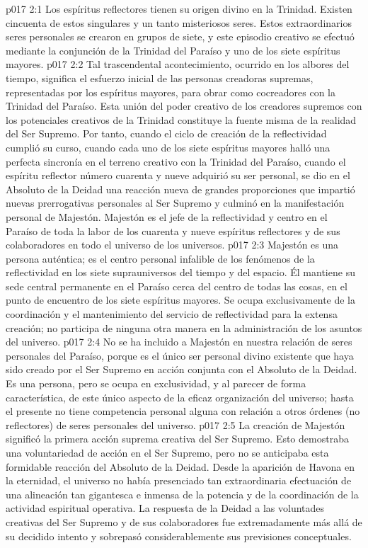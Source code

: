 \vs p017 2:1 Los espíritus reflectores tienen su origen divino en la Trinidad. Existen cincuenta de estos singulares y un tanto misteriosos seres. Estos extraordinarios seres personales se crearon en grupos de siete, y este episodio creativo se efectuó mediante la conjunción de la Trinidad del Paraíso y uno de los siete espíritus mayores.
\vs p017 2:2 Tal trascendental acontecimiento, ocurrido en los albores del tiempo, significa el esfuerzo inicial de las personas creadoras supremas, representadas por los espíritus mayores, para obrar como cocreadores con la Trinidad del Paraíso. Esta unión del poder creativo de los creadores supremos con los potenciales creativos de la Trinidad constituye la fuente misma de la realidad del Ser Supremo. Por tanto, cuando el ciclo de creación de la reflectividad cumplió su curso, cuando cada uno de los siete espíritus mayores halló una perfecta sincronía en el terreno creativo con la Trinidad del Paraíso, cuando el espíritu reflector número cuarenta y nueve adquirió su ser personal, se dio en el Absoluto de la Deidad una reacción nueva de grandes proporciones que impartió nuevas prerrogativas personales al Ser Supremo y culminó en la manifestación personal de Majestón. Majestón es el jefe de la reflectividad y centro en el Paraíso de toda la labor de los cuarenta y nueve espíritus reflectores y de sus colaboradores en todo el universo de los universos.
\vs p017 2:3 Majestón es una persona auténtica; es el centro personal infalible de los fenómenos de la reflectividad en los siete suprauniversos del tiempo y del espacio. Él mantiene su sede central permanente en el Paraíso cerca del centro de todas las cosas, en el punto de encuentro de los siete espíritus mayores. Se ocupa exclusivamente de la coordinación y el mantenimiento del servicio de reflectividad para la extensa creación; no participa de ninguna otra manera en la administración de los asuntos del universo.
\vs p017 2:4 No se ha incluido a Majestón en nuestra relación de seres personales del Paraíso, porque es el único ser personal divino existente que haya sido creado por el Ser Supremo en acción conjunta con el Absoluto de la Deidad. Es una persona, pero se ocupa en exclusividad, y al parecer de forma característica, de este único aspecto de la eficaz organización del universo; hasta el presente no tiene competencia personal alguna con relación a otros órdenes (no reflectores) de seres personales del universo.
\vs p017 2:5 \pc La creación de Majestón significó la primera acción suprema creativa del Ser Supremo. Esto demostraba una voluntariedad de acción en el Ser Supremo, pero no se anticipaba esta formidable reacción del Absoluto de la Deidad. Desde la aparición de Havona en la eternidad, el universo no había presenciado tan extraordinaria efectuación de una alineación tan gigantesca e inmensa de la potencia y de la coordinación de la actividad espiritual operativa. La respuesta de la Deidad a las voluntades creativas del Ser Supremo y de sus colaboradores fue extremadamente más allá de su decidido intento y sobrepasó considerablemente sus previsiones conceptuales.
